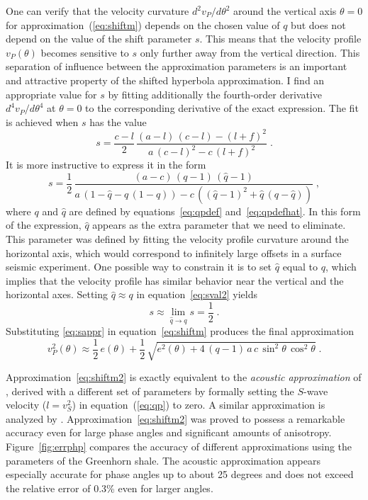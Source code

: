 One can verify that the velocity curvature $d^2 v_P/d \theta^2$ around the
vertical axis $\theta=0$ for approximation~(\ref{eq:shiftm}) depends on the
chosen value of $q$ but does not depend on the value of the shift parameter
$s$. This means that the velocity profile $v_P(\theta)$ becomes sensitive to
$s$ only further away from the vertical direction.  This separation of
influence between the approximation parameters is an important and attractive
property of the shifted hyperbola approximation. I find an appropriate value
for $s$ by fitting additionally the fourth-order derivative $d^4 v_P/d
\theta^4$ at $\theta=0$ to the corresponding derivative of the exact
expression. The fit is achieved when $s$ has the value
\begin{equation}
  \label{eq:sval}
  s = \frac{c-l}{2}\,\frac{(a-l)\,(c-l) - (l+f)^2}
  {a\,(c-l)^2 - c\,(l+f)^2}\;.  
\end{equation}
It is more instructive to express it in the form
\begin{equation}
  \label{eq:sval2}
  s = \frac{1}{2}\,\frac{(a-c)\,(q-1)\,(\hat{q}-1)}
  {a\,\left(1 - \hat{q} - q\,(1-q)\right) - 
    c\,\left((\hat{q}-1)^2+\hat{q}\,(q-\hat{q})\right)}\;,  
\end{equation}
where $q$ and $\hat{q}$ are defined by equations~\eqref{eq:qpdef}
and~\eqref{eq:qpdefhat}.  In this form of the expression, $\hat{q}$ appears as
the extra parameter that we need to eliminate.  This parameter was defined by
fitting the velocity profile curvature around the horizontal axis, which would
correspond to infinitely large offsets in a surface seismic experiment. One
possible way to constrain it is to set $\hat{q}$ equal to $q$, which implies
that the velocity profile has similar behavior near the vertical and the
horizontal axes. Setting $\hat{q} \approx q$ in equation~\eqref{eq:sval2}
yields
\begin{equation}
  \label{eq:sappr}
  s \approx \lim_{\hat{q} \rightarrow q} s = \frac{1}{2}\;.
\end{equation}
Substituting \eqref{eq:sappr} in equation~\eqref{eq:shiftm} produces the final
approximation
\begin{equation}
  \label{eq:shiftm2}
  v_P^2(\theta) \approx \frac{1}{2}\,e(\theta) + 
  \frac{1}{2}\,\sqrt{e^2(\theta) + 
    4\,(q-1)\,a\,c\,\sin^2{\theta}\,\cos^2{\theta}}\;.
\end{equation}

Approximation~\eqref{eq:shiftm2} is exactly equivalent to the \emph{acoustic
  approximation} of \cite{GEO63-02-06230631,GEO65-04-12391250},
derived with a different set of parameters by formally setting the $S$-wave
velocity ($l=v_S^2$) in equation~(\ref{eq:qp}) to zero. A similar
  approximation is analyzed by \cite{ANI00-00-03490361}.
Approximation~\eqref{eq:shiftm2} was proved to possess a remarkable accuracy
even for large phase angles and significant amounts of anisotropy.
Figure~\ref{fig:errphp} compares the accuracy of different approximations using
the parameters of the Greenhorn shale. The acoustic approximation appears
especially accurate for phase angles up to about 25 degrees and does not
exceed the relative error of 0.3\% even for larger angles.

